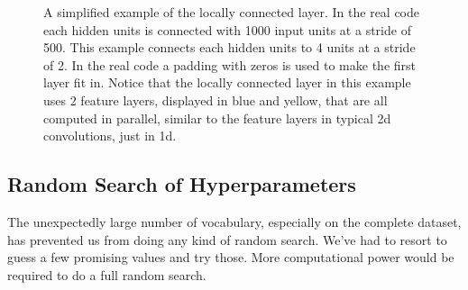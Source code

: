 \documentclass{article}
\begin{document}
\begin{figure} [H]
  \caption{A simplified example of the locally connected layer. In the real code each hidden units is connected with 1000 input units at a stride of 500. This example connects each 
  hidden units to 4 units at a stride of 2. In the real code a padding with zeros is used to make the first layer fit in. Notice that the locally connected layer in this example
  uses 2 feature layers, displayed in blue and yellow, that are all computed in parallel, similar to the feature layers in typical 2d convolutions, just in 1d.}
  \label{fig:locallyconnected}
\end{figure}


\subsection*{Random Search of Hyperparameters}
The unexpectedly large number of vocabulary, especially on the complete dataset, has prevented us from doing any kind of random search. We've had to resort to guess a few promising values and try those.
More computational power would be required to do a full random search.
\end{document}
